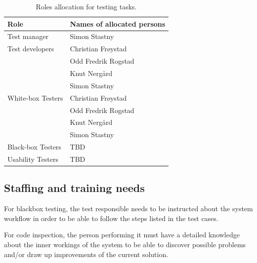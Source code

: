 \documentclass[11pt]{book}
\begin{document}
\begin{table}[H]
    \centering
    \begin{tabular}{| l | l |}
        \hline
        Role                & Names of allocated persons    \\ \hline

        Test manager        & Simon Stastny                 \\ \hline

        Test developers     & Christian Frøystad            \\
                            & Odd Fredrik Rogstad           \\
                            & Knut Nergård                  \\
                            & Simon Stastny                 \\ \hline

        White-box Testers   & Christian Frøystad            \\
                            & Odd Fredrik Rogstad           \\
                            & Knut Nergård                  \\
                            & Simon Stastny                 \\ \hline

        Black-box Testers   & TBD                           \\ \hline %

        Usability Testers   & TBD                           \\ \hline %
    \end{tabular}
    \caption{Roles allocation for testing tasks.}
    \label{tab:test_plan_roles_allocation}
\end{table}

\subsection{Staffing and training needs}
For blackbox testing, the test responsible needs to be instructed about the system workflow in order to be able to follow the steps listed in the test cases.

For code inspection, the person performing it must have a detailed knowledge about the inner workings of the system to be able to discover possible problems and/or draw up improvements of the current solution.
\end{document}

